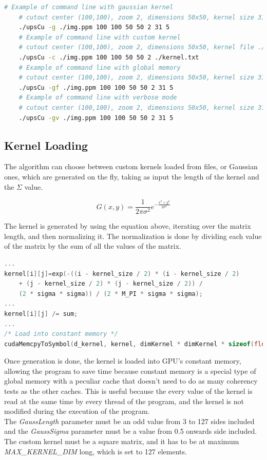 \begin{lstlisting}[language=bash]
    # Example of command line with gaussian kernel
    # cutout center (100,100), zoom 2, dimensions 50x50, kernel size 31, sigma 5
    ./upsCu -g ./img.ppm 100 100 50 50 2 31 5 
    # Example of command line with custom kernel
    # cutout center (100,100), zoom 2, dimensions 50x50, kernel file ./kernel.txt
    ./upsCu -c ./img.ppm 100 100 50 50 2 ./kernel.txt
    # Example of command line with global memory
    # cutout center (100,100), zoom 2, dimensions 50x50, kernel size 31, sigma 5
    ./upsCu -gf ./img.ppm 100 100 50 50 2 31 5 
    # Example of command line with verbose mode
    # cutout center (100,100), zoom 2, dimensions 50x50, kernel size 31, sigma 5
    ./upsCu -gv ./img.ppm 100 100 50 50 2 31 5
\end{lstlisting}

    \subsection{Kernel Loading}
    The algorithm can choose between custom kernels loaded from files, or Gaussian ones, which are generated on the fly,
    taking as input the length of the kernel and the $\Sigma$ value.
    
    \begin{equation}
        \label{eq:gauss}
        G(x,y) = \frac{1}{2\pi\sigma^2}e^{-\frac{x^2+y^2}{2\sigma^2}}
    \end{equation}
    
    The kernel is generated by using the equation above, iterating over the matrix length, 
    and then normalizing it. The normalization is done by dividing each value of the matrix by the sum of all the values of the matrix.
    \noindent\small\begin{lstlisting}[language=C]
...
kernel[i][j]=exp(-((i - kernel_size / 2) * (i - kernel_size / 2)
    + (j - kernel_size / 2) * (j - kernel_size / 2)) / 
    (2 * sigma * sigma)) / (2 * M_PI * sigma * sigma);
...
kernel[i][j] /= sum;
...
/* Load into constant memory */
cudaMemcpyToSymbol(d_kernel, kernel, dimKernel * dimKernel * sizeof(float));
    \end{lstlisting}

    Once generation is done, the kernel is loaded into 
    GPU's constant memory, allowing the program to save time because constant memory is a special type of global memory 
    with a peculiar cache that doesn’t need to do as many coherency tests as the other caches. This is useful because the every value of the kernel is read at the same 
    time by every thread of the program, and the kernel is not modified during the execution of the program.\\
    The \textit{GaussLength} parameter must be an odd value from 3 to 127 sides included and the \textit{GaussSigma} parameter must be a value from 0.5 onwards side included.
    The custom kernel must be a square matrix, and it has to be at maximum \textit{MAX\_KERNEL\_DIM} long, which is set to 127 elements.

